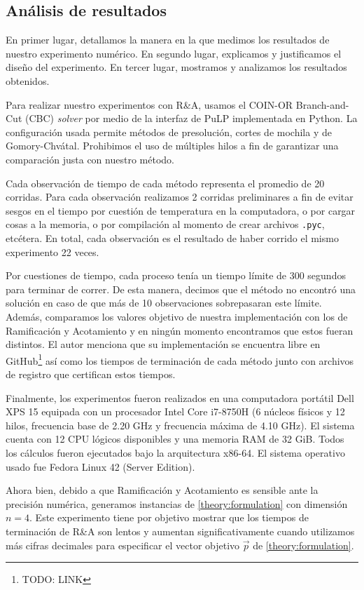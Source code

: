 \subsection{Análisis de resultados}
\label{subsec:inf:res}
\noindent
En primer lugar, detallamos la manera en la que medimos los resultados de nuestro experimento
numérico. En segundo lugar, explicamos y justificamos el diseño del experimento. En tercer lugar,
mostramos y analizamos los resultados obtenidos.

Para realizar nuestro experimentos con R\&A, usamos el COIN-OR Branch-and-Cut (CBC) \textit{solver}
por medio de la interfaz de PuLP implementada en Python. La configuración usada permite métodos de
presolución, cortes de mochila y de Gomory-Chvátal. Prohibimos el uso de múltiples hilos a fin de
garantizar una comparación justa con nuestro método.

Cada observación de tiempo de cada método representa el promedio de 20 corridas. Para cada
observación realizamos 2 corridas preliminares a fin de evitar sesgos en el tiempo por cuestión de
temperatura en la computadora, o por cargar cosas a la memoria, o por compilación al momento de
crear archivos \texttt{.pyc}, etcétera. En total, cada observación es el resultado de haber corrido
el mismo experimento 22 veces.

Por cuestiones de tiempo, cada proceso tenía un tiempo límite de 300 segundos para terminar de
correr. De esta manera, decimos que el método no encontró una solución en caso de que más de 10
observaciones sobrepasaran este límite. Además, comparamos los valores objetivo de nuestra
implementación con los de Ramificación y Acotamiento y en ningún momento encontramos que estos
fueran distintos. El autor menciona que su implementación se encuentra libre en
GitHub\footnote{TODO: LINK} así como los tiempos de terminación de cada método junto con archivos de
registro que certifican estos tiempos.

Finalmente, los experimentos fueron realizados en una computadora portátil Dell XPS 15 equipada con
un procesador Intel Core i7-8750H (6 núcleos físicos y 12 hilos, frecuencia base de 2.20 GHz y
frecuencia máxima de 4.10 GHz). El sistema cuenta con 12 CPU lógicos disponibles y una memoria RAM
de 32 GiB. Todos los cálculos fueron ejecutados bajo la arquitectura x86-64. El sistema operativo
usado fue Fedora Linux 42 (Server Edition).

Ahora bien, debido a que Ramificación y Acotamiento es sensible ante la precisión numérica,
generamos instancias de \eqref{theory:formulation} con dimensión $n = 4$. Este experimento tiene por
objetivo mostrar que los tiempos de terminación de R\&A son lentos y aumentan significativamente
cuando utilizamos más cifras decimales para especificar el vector objetivo $\vec{p}$ de
\eqref{theory:formulation}.


